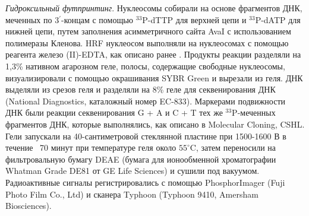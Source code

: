 \emph{Гидроксильный футпринтинг}. Нуклеосомы собирали на основе фрагментов ДНК, меченных по 3$^\prime$-концам с помощью $^{33}$P-dTTP для верхней цепи и $^{33}$P-dATP для нижней цепи, путем заполнения асимметричного сайта AvaI с использованием полимеразы Кленова. HRF нуклеосом выполняли на нуклеосомах с помощью реагента железо (II)-EDTA, как описано ранее \cite{schwanbeck_spatial_2004}. Продукты реакции разделяли на 1,3\% нативном агарозном геле, полосы, содержащие свободные нуклеосомы, визуализировали с помощью окрашивания SYBR Green и вырезали из геля. ДНК выделяли из срезов геля и разделяли на 8\% геле для секвенирования ДНК (National Diagnostics, каталожный номер EC-833). Маркерами подвижности ДНК были реакции секвенирования G + A и C + T тех же $^{33}$P-меченных фрагментов ДНК, которые выполнялись, как описано в Molecular Cloning, CSHL. Гели запускали на 40-сантиметровой стеклянной пластине при 1500-1600 В в течение ~70 минут при температуре геля около $55^{\circ}$C, затем переносили на фильтровальную бумагу DEAE (бумага для ионообменной хроматографии Whatman Grade DE81 от GE Life Sciences) и сушили под вакуумом. Радиоактивные сигналы регистрировались с помощью PhosphorImager (Fuji Photo Film Co., Ltd) и сканера Typhoon (Typhoon 9410, Amersham Biosciences).

